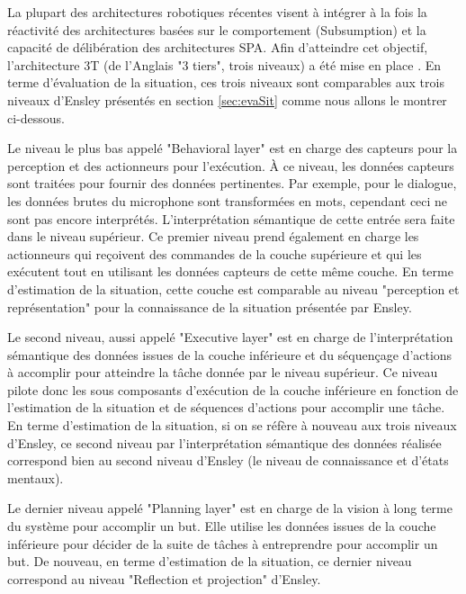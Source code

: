 \documentclass[a4paper,11pt,twoside]{StyleThese}
\begin{document}
La plupart des architectures robotiques récentes visent à intégrer à la fois la réactivité des architectures basées sur le comportement (Subsumption) et la capacité de délibération des architectures SPA.
Afin d'atteindre cet objectif, l'architecture 3T (de l'Anglais "3 tiers", trois niveaux) a été mise en place \cite{bonasso1995experiences}. En terme d'évaluation de la situation, ces trois niveaux sont comparables aux trois niveaux d'Ensley présentés en section \ref{sec:evaSit} comme nous allons le montrer ci-dessous.

Le niveau le plus bas appelé "Behavioral layer" est en charge des capteurs pour la perception et des actionneurs pour l'exécution.
À ce niveau, les données capteurs sont traitées pour fournir des données pertinentes. Par exemple, pour le dialogue, les données brutes du microphone sont transformées en mots, cependant ceci ne sont pas encore interprétés. L'interprétation sémantique de cette entrée sera faite dans le niveau supérieur.
Ce premier niveau prend également en charge les actionneurs qui reçoivent des commandes de la couche supérieure et qui les exécutent tout en utilisant les données capteurs de cette même couche.
En terme d'estimation de la situation, cette couche est comparable au niveau "perception et représentation" pour la connaissance de la situation présentée par Ensley.

Le second niveau, aussi appelé "Executive layer" est en charge de l'interprétation sémantique des données issues de la couche inférieure et du séquençage d'actions à accomplir pour atteindre la tâche donnée par le niveau supérieur. Ce niveau pilote donc les sous composants d'exécution de la couche inférieure en fonction de l'estimation de la situation et de séquences d'actions pour accomplir une tâche. En terme d'estimation de la situation, si on se réfère à nouveau aux trois niveaux d'Ensley, ce second niveau par l'interprétation sémantique des données réalisée correspond bien au second niveau d'Ensley (le niveau de connaissance et d'états mentaux).

Le dernier niveau appelé "Planning layer" est en charge de la vision à long terme du système pour accomplir un but. Elle utilise les données issues de la couche inférieure pour décider de la suite de tâches à entreprendre pour accomplir un but. De nouveau, en terme d'estimation de la situation, ce dernier niveau correspond au niveau "Reflection et projection" d'Ensley.
\end{document}
